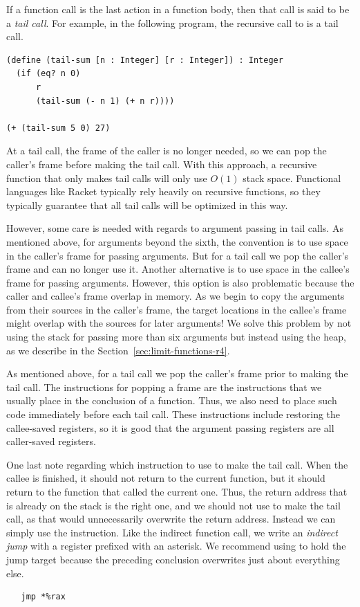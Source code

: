 \documentclass[11pt]{book}
\begin{document}
If a function call is the last action in a function body, then that
call is said to be a \emph{tail call}.
For example, in the following
program, the recursive call to  is a tail call.
\begin{center}
\begin{lstlisting}
(define (tail-sum [n : Integer] [r : Integer]) : Integer
  (if (eq? n 0) 
      r
      (tail-sum (- n 1) (+ n r))))

(+ (tail-sum 5 0) 27)
\end{lstlisting}
\end{center}
At a tail call, the frame of the caller is no longer needed, so we
can pop the caller's frame before making the tail call. With this
approach, a recursive function that only makes tail calls will only
use $O(1)$ stack space.  Functional languages like Racket typically
rely heavily on recursive functions, so they typically guarantee that
all tail calls will be optimized in this way.

However, some care is needed with regards to argument passing in tail
calls.  As mentioned above, for arguments beyond the sixth, the
convention is to use space in the caller's frame for passing
arguments.  But for a tail call we pop the caller's frame and can no
longer use it.  Another alternative is to use space in the callee's
frame for passing arguments. However, this option is also problematic
because the caller and callee's frame overlap in memory.  As we begin
to copy the arguments from their sources in the caller's frame, the
target locations in the callee's frame might overlap with the sources
for later arguments! We solve this problem by not using the stack for
passing more than six arguments but instead using the heap, as we
describe in the Section~\ref{sec:limit-functions-r4}.

As mentioned above, for a tail call we pop the caller's frame prior to
making the tail call. The instructions for popping a frame are the
instructions that we usually place in the conclusion of a
function. Thus, we also need to place such code immediately before
each tail call. These instructions include restoring the callee-saved
registers, so it is good that the argument passing registers are all
caller-saved registers.

One last note regarding which instruction to use to make the tail
call. When the callee is finished, it should not return to the current
function, but it should return to the function that called the current
one. Thus, the return address that is already on the stack is the
right one, and we should not use  to make the tail call, as
that would unnecessarily overwrite the return address. Instead we can
simply use the  instruction. Like the indirect function call,
we write an \emph{indirect jump} with a register
prefixed with an asterisk.  We recommend using  to hold the
jump target because the preceding conclusion overwrites just about
everything else.
\begin{lstlisting}
   jmp *%rax
\end{lstlisting}
\end{document}
